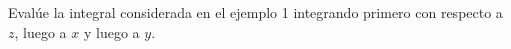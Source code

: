 \item Evalúe la integral considerada en el ejemplo 1 integrando primero con respecto a $z$, luego a $x$ y luego a $y$.
